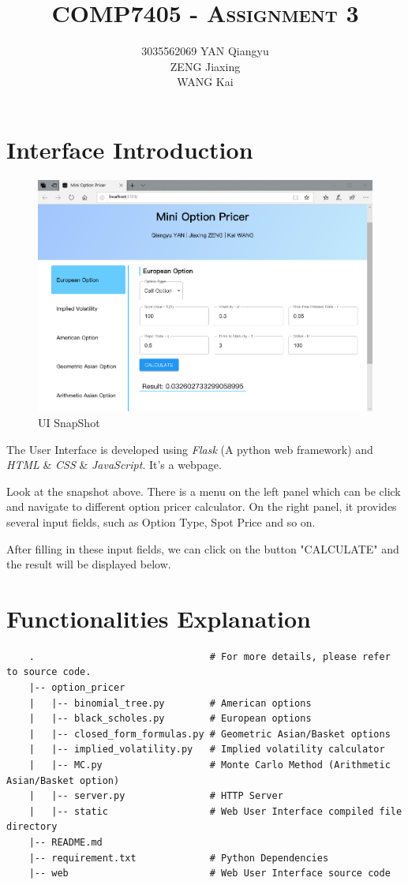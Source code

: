 \documentclass[11pt,a4paper]{article}
\title{\textsc{COMP7405 - Assignment 3}}
\author{	3035562069 YAN Qiangyu\\
                ZENG Jiaxing \\
                WANG Kai
            }
\date{}
\begin{document}
    \maketitle

    \section{Interface Introduction}
    
    \begin{figure}[h]
    \centering
    \includegraphics[width=\linewidth]{snapshot1}
    \caption{UI SnapShot}
    \end{figure}

    The User Interface is developed using 
    \emph{Flask} (A python web framework) 
    and \emph{HTML} \& \emph{CSS} \& \emph{JavaScript}. 
    It's a webpage.
    

    Look at the snapshot above. There is a menu on the left panel which can
    be click and navigate to different option pricer calculator. On the
    right panel, it provides several input fields, such as Option Type, Spot
    Price and so on.

    After filling in these input fields, we can click on the button
    "CALCULATE" and the result will be displayed below.

    \newpage
    \section{Functionalities Explanation}
    \begin{verbatim}
    .                               # For more details, please refer to source code.
    |-- option_pricer
    |   |-- binomial_tree.py        # American options
    |   |-- black_scholes.py        # European options
    |   |-- closed_form_formulas.py # Geometric Asian/Basket options
    |   |-- implied_volatility.py   # Implied volatility calculator
    |   |-- MC.py                   # Monte Carlo Method (Arithmetic Asian/Basket option)
    |   |-- server.py               # HTTP Server
    |   |-- static                  # Web User Interface compiled file directory
    |-- README.md
    |-- requirement.txt             # Python Dependencies
    |-- web                         # Web User Interface source code
    \end{verbatim}
\end{document}
